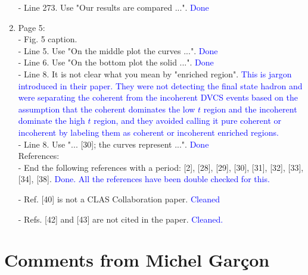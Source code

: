 \documentclass[a4paper,11pt,twoside]{article}
\begin{document}
\begin{enumerate}
- Line 273. Use "Our results are compared ...".
     \textcolor{blue}{Done}
~\\
\item Page 5:\\
 - Fig. 5 caption.\\
   - Line 5. Use "On the middle plot the curves ...".
     \textcolor{blue}{Done}\\
   - Line 6. Use "On the bottom plot the solid ...".
     \textcolor{blue}{Done}\\
   - Line 8. It is not clear what you mean by "enriched region".  
     \textcolor{blue}{This is jargon introduced in their paper. They were not 
     detecting the final state hadron and were separating the coherent from the 
     incoherent DVCS events based on the assumption that the coherent dominates 
     the low $t$ region and the incoherent dominate the high $t$ region, and 
     they avoided calling it pure coherent or incoherent by labeling them as 
     coherent or incoherent enriched regions. }\\
   - Line 8. Use "... [30]; the curves represent ...".
     \textcolor{blue}{Done}
~\\
References:\\
 - End the following references with a period: [2], [28], [29], [30], [31], 
   [32], [33], [34], [38].
     \textcolor{blue}{Done. All the references have been double checked for 
     this.}

 - Ref. [40] is not a CLAS Collaboration paper.
     \textcolor{blue}{Cleaned}

 - Refs. [42] and [43] are not cited in the paper.
     \textcolor{blue}{Cleaned.}
   
  
\end{enumerate}



\section{Comments from Michel Gar\c{c}on}
\end{document}
